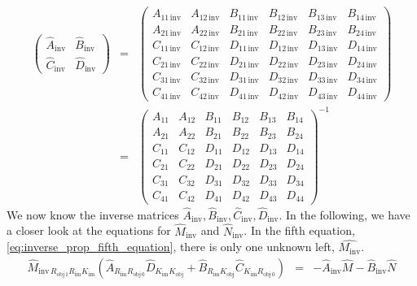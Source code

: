 \documentclass[12pt,a4paper,twoside,openright,BCOR10mm,headsepline,titlepage,abstracton,chapterprefix,final]{scrreprt}
\newcommand\im{\textrm{im}}
\newcommand\obj{\textrm{obj}}
\begin{document}
\begin{eqnarray}
 \begin{pmatrix}
  \hat{A}_{\text{inv}} & \hat{B}_{\text{inv}} \\ \hat{C}_{\text{inv}} & \hat{D}_{\text{inv}}
 \end{pmatrix}
 &=&
 \begin{pmatrix}
  A_{11\,\text{inv}} & A_{12\,\text{inv}} & B_{11\,\text{inv}} & B_{12\,\text{inv}} & B_{13\,\text{inv}} & B_{14\,\text{inv}} \\
  A_{21\,\text{inv}} & A_{22\,\text{inv}} & B_{21\,\text{inv}} & B_{22\,\text{inv}} & B_{23\,\text{inv}} & B_{24\,\text{inv}} \\
  C_{11\,\text{inv}} & C_{12\,\text{inv}} & D_{11\,\text{inv}} & D_{12\,\text{inv}} & D_{13\,\text{inv}} & D_{14\,\text{inv}} \\
  C_{21\,\text{inv}} & C_{22\,\text{inv}} & D_{21\,\text{inv}} & D_{22\,\text{inv}} & D_{23\,\text{inv}} & D_{24\,\text{inv}} \\
  C_{31\,\text{inv}} & C_{32\,\text{inv}} & D_{31\,\text{inv}} & D_{32\,\text{inv}} & D_{33\,\text{inv}} & D_{34\,\text{inv}} \\
  C_{41\,\text{inv}} & C_{42\,\text{inv}} & D_{41\,\text{inv}} & D_{42\,\text{inv}} & D_{43\,\text{inv}} & D_{44\,\text{inv}}
 \end{pmatrix}
 \\
 &=&
 \begin{pmatrix}
  A_{11} & A_{12} & B_{11} & B_{12} & B_{13} & B_{14} \\
  A_{21} & A_{22} & B_{21} & B_{22} & B_{23} & B_{24} \\
  C_{11} & C_{12} & D_{11} & D_{12} & D_{13} & D_{14} \\
  C_{21} & C_{22} & D_{21} & D_{22} & D_{23} & D_{24} \\
  C_{31} & C_{32} & D_{31} & D_{32} & D_{33} & D_{34} \\
  C_{41} & C_{42} & D_{41} & D_{42} & D_{43} & D_{44}
 \end{pmatrix}^{-1}
\end{eqnarray}
We now know the inverse matrices $\hat{A}_{\text{inv}}, \hat{B}_{\text{inv}}, \hat{C}_{\text{inv}}, \hat{D}_{\text{inv}}$.
In the following, we have a closer look at the equations for $\hat{M}_{\text{inv}}$ and $\hat{N}_{\text{inv}}$.
In the fifth equation, \eqref{eq:inverse_prop_fifth_equation}, there is only one unknown left, $\hat{M_{\text{inv}}}$.
\begin{eqnarray}
 \hat{M}_{\text{inv}\,R_{\obj\,1} R_\im K_\im} 
  \left(
    \hat{A}_{R_\im R_{\obj\,0}} \hat{D}_{K_\im K_\obj} + \hat{B}_{R_\im K_\obj} \hat{C}_{K_\im R_{\obj\,0}} 
  \right)
 &=& -\hat{A}_{\text{inv}} \hat{M} - \hat{B}_{\text{inv}} \hat{N} \nonumber\\
\end{eqnarray}
\end{document}
